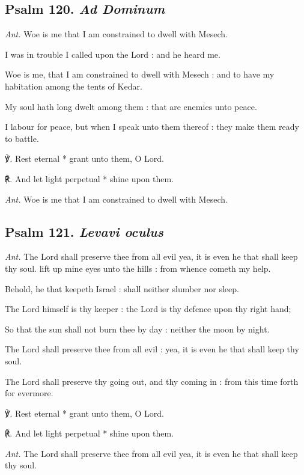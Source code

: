 \subsection{Psalm 120. \textit{Ad Dominum}}\par\noindent
\textit{Ant.} Woe is me {\dag} that I am constrained to dwell with Mesech.\par
{} I was in trouble I called upon the Lord : and he heard me.\par
{}
Woe is me, that I am constrained to dwell with Mesech : and to have my habitation among the tents of Kedar.\par
{}My soul hath long dwelt among them : that are enemies unto peace.\par
{}I labour for peace, but when I speak unto them thereof : they make them ready to battle.\par
℣. Rest eternal * grant unto them, O Lord.\par
℟. And let light perpetual * shine upon them.\par\noindent
\textit{Ant.} Woe is me that I am constrained to dwell with Mesech.
\subsection{Psalm 121. \textit{Levavi oculus}}\noindent
\textit{Ant.} The Lord {\dag} shall preserve thee from all evil yea, it is even he that shall keep thy soul.
 lift up mine eyes unto the hills : from whence cometh my help.\par
{}
Behold, he that keepeth Israel : shall neither slumber nor sleep.\par
{}The Lord himself is thy keeper : the Lord is thy defence upon thy right hand;\par
{}So that the sun shall not burn thee by day : neither the moon by night.\par
{}The Lord shall preserve thee from all evil : yea, it is even he that shall keep thy soul.\par
{}The Lord shall preserve thy going out, and thy coming in : from this time forth for evermore.
\par
℣. Rest eternal * grant unto them, O Lord.\par
℟. And let light perpetual * shine upon them.\par\noindent
\textit{Ant.} The Lord shall preserve thee from all evil yea, it is even he that shall keep thy soul.

